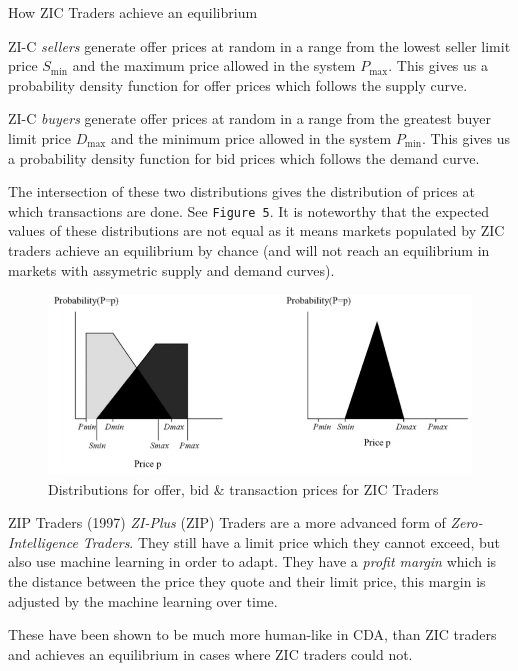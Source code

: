 \documentclass[11pt,a4paper]{article}
\begin{document}
\begin{proposition}{How ZIC Traders achieve an equilibrium}
  \par ZI-C \textit{sellers} generate offer prices at random in a range from the lowest seller limit price $S_\text{min}$ and the maximum price allowed in the system $P_\text{max}$. This gives us a probability density function for offer prices which follows the supply curve.
  \par ZI-C \textit{buyers} generate offer prices at random in a range from the greatest buyer limit price $D_\text{max}$ and the minimum price allowed in the system $P_\text{min}$. This gives us a probability density function for bid prices which follows the demand curve.
  \par The intersection of these two distributions gives the distribution of prices at which transactions are done. See \texttt{Figure 5}. It is noteworthy that the expected values of these distributions are not equal as it means markets populated by ZIC traders achieve an equilibrium by chance (and will not reach an equilibrium in markets with assymetric supply and demand curves).
\end{proposition}

\begin{figure}[ht!]
  \centering
  \includegraphics[width=.5\textwidth]{ZICTransactions.PNG}
  \caption{Distributions for offer, bid \& transaction prices for ZIC Traders}
\end{figure}

\begin{proposition}{ZIP Traders (1997)}
  \textit{ZI-Plus} (ZIP) Traders are a more advanced form of \textit{Zero-Intelligence Traders}. They still have a limit price which they cannot exceed, but also use machine learning in order to adapt. They have a \textit{profit margin} which is the distance between the price they quote and their limit price, this margin is adjusted by the machine learning over time.
  \par These have been shown to be much more human-like in CDA, than ZIC traders and achieves an equilibrium in cases where ZIC traders could not.
\end{proposition}
\end{document}
